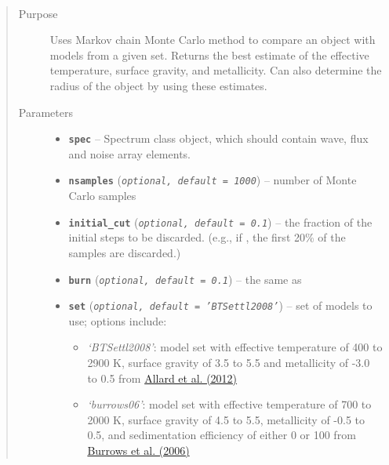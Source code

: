 \documentclass[letterpaper,10pt,english]{sphinxmanual}
\begin{document}
\begin{fulllineitems}
\label{splat_model:splat_model.modelFitMCMC}~\begin{quote}\begin{description}
\item[{Purpose}] \leavevmode
Uses Markov chain Monte Carlo method to compare an object with models from a
given set. Returns the best estimate of the effective temperature, surface
gravity, and metallicity. Can also determine the radius of the object by
using these estimates.

\item[{Parameters}] \leavevmode\begin{itemize}
\item {} 
\textbf{\texttt{spec}} -- Spectrum class object, which should contain wave, flux and
noise array elements.

\item {} 
\textbf{\texttt{nsamples}} (\emph{\texttt{optional, default = 1000}}) -- number of Monte Carlo samples

\item {} 
\textbf{\texttt{initial\_cut}} (\emph{\texttt{optional, default = 0.1}}) -- the fraction of the initial steps to be discarded. (e.g., if
, the first 20\% of the samples are discarded.)

\item {} 
\textbf{\texttt{burn}} (\emph{\texttt{optional, default = 0.1}}) -- the same as 

\item {} 
\textbf{\texttt{set}} (\emph{\texttt{optional, default = 'BTSettl2008'}}) -- 
set of models to use; options include:
\begin{itemize}
\item {} 
\emph{`BTSettl2008'}: model set with effective temperature of 400 to 2900 K, surface gravity of 3.5 to 5.5 and metallicity of -3.0 to 0.5
from \href{http://adsabs.harvard.edu/abs/2012RSPTA.370.2765A}{Allard et al. (2012)}

\item {} 
\emph{`burrows06'}: model set with effective temperature of 700 to 2000 K, surface gravity of 4.5 to 5.5, metallicity of -0.5 to 0.5,
and sedimentation efficiency of either 0 or 100 from \href{http://adsabs.harvard.edu/abs/2006ApJ...640.1063B}{Burrows et al. (2006)}


\end{itemize}
\end{itemize}
\end{description}
\end{quote}
\end{fulllineitems}
\end{document}
